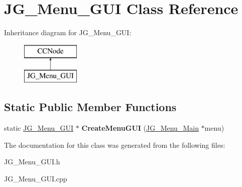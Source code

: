 \hypertarget{class_j_g___menu___g_u_i}{\section{J\-G\-\_\-\-Menu\-\_\-\-G\-U\-I Class Reference}
\label{class_j_g___menu___g_u_i}
}
Inheritance diagram for J\-G\-\_\-\-Menu\-\_\-\-G\-U\-I\-:\begin{figure}[H]
\begin{center}
\leavevmode
\includegraphics[height=2.000000cm]{class_j_g___menu___g_u_i}
\end{center}
\end{figure}
\subsection*{Static Public Member Functions}
\begin{DoxyCompactItemize}
\item 
\hypertarget{class_j_g___menu___g_u_i_a1af6b38434dcf86b676d7e636422ae24}{static \hyperlink{class_j_g___menu___g_u_i}{J\-G\-\_\-\-Menu\-\_\-\-G\-U\-I} $\ast$ {\bfseries Create\-Menu\-G\-U\-I} (\hyperlink{class_j_g___menu___main}{J\-G\-\_\-\-Menu\-\_\-\-Main} $\ast$menu)}\label{class_j_g___menu___g_u_i_a1af6b38434dcf86b676d7e636422ae24}

\end{DoxyCompactItemize}


The documentation for this class was generated from the following files\-:\begin{DoxyCompactItemize}
\item 
J\-G\-\_\-\-Menu\-\_\-\-G\-U\-I.\-h\item 
J\-G\-\_\-\-Menu\-\_\-\-G\-U\-I.\-cpp\end{DoxyCompactItemize}
